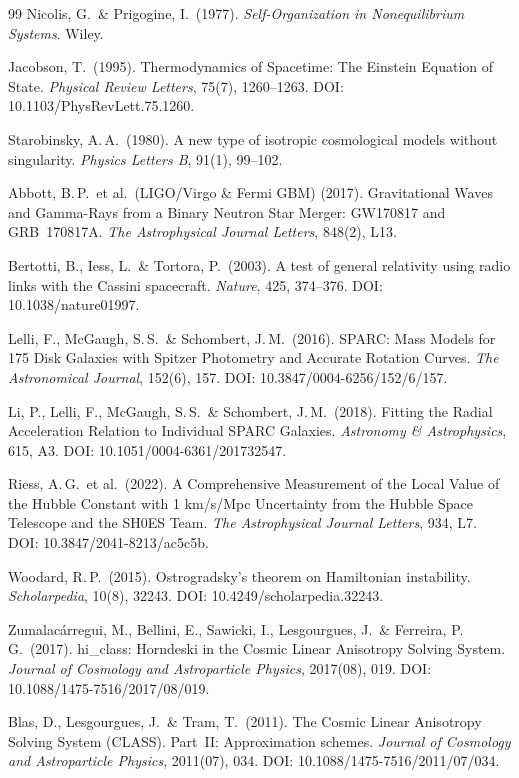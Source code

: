 \documentclass[aps,prd,twocolumn,superscriptaddress,nofootinbib]{revtex4-2}
\begin{document}
\begin{thebibliography}{99}
Nicolis, G.\ \& Prigogine, I.\ (1977).
\textit{Self-Organization in Nonequilibrium Systems}. Wiley.

Jacobson, T.\ (1995).
Thermodynamics of Spacetime: The Einstein Equation of State.
\textit{Physical Review Letters}, 75(7), 1260--1263.
DOI: 10.1103/PhysRevLett.75.1260.

Starobinsky, A.\,A.\ (1980).
A new type of isotropic cosmological models without singularity.
\textit{Physics Letters B}, 91(1), 99--102.

Abbott, B.\,P.\ et al.\ (LIGO/Virgo \& Fermi GBM) (2017).
Gravitational Waves and Gamma-Rays from a Binary Neutron Star Merger: GW170817 and GRB~170817A.
\textit{The Astrophysical Journal Letters}, 848(2), L13.

Bertotti, B., Iess, L.\ \& Tortora, P.\ (2003).
A test of general relativity using radio links with the Cassini spacecraft.
\textit{Nature}, 425, 374--376.
DOI: 10.1038/nature01997.

Lelli, F., McGaugh, S.\,S.\ \& Schombert, J.\,M.\ (2016).
SPARC: Mass Models for 175 Disk Galaxies with Spitzer Photometry and Accurate Rotation Curves.
\textit{The Astronomical Journal}, 152(6), 157.
DOI: 10.3847/0004-6256/152/6/157.

Li, P., Lelli, F., McGaugh, S.\,S.\ \& Schombert, J.\,M.\ (2018).
Fitting the Radial Acceleration Relation to Individual SPARC Galaxies.
\textit{Astronomy \& Astrophysics}, 615, A3.
DOI: 10.1051/0004-6361/201732547.

Riess, A.\,G.\ et al.\ (2022).
A Comprehensive Measurement of the Local Value of the Hubble Constant with 1 km/s/Mpc Uncertainty from the Hubble Space Telescope and the SH0ES Team.
\textit{The Astrophysical Journal Letters}, 934, L7.
DOI: 10.3847/2041-8213/ac5c5b.

Woodard, R.\,P.\ (2015).
Ostrogradsky's theorem on Hamiltonian instability.
\textit{Scholarpedia}, 10(8), 32243.
DOI: 10.4249/scholarpedia.32243.

Zumalac\'arregui, M., Bellini, E., Sawicki, I., Lesgourgues, J.\ \& Ferreira, P.\,G.\ (2017).
hi\_class: Horndeski in the Cosmic Linear Anisotropy Solving System.
\textit{Journal of Cosmology and Astroparticle Physics}, 2017(08), 019.
DOI: 10.1088/1475-7516/2017/08/019.

Blas, D., Lesgourgues, J.\ \& Tram, T.\ (2011).
The Cosmic Linear Anisotropy Solving System (CLASS). Part~II: Approximation schemes.
\textit{Journal of Cosmology and Astroparticle Physics}, 2011(07), 034.
DOI: 10.1088/1475-7516/2011/07/034.


\end{thebibliography}
\end{document}
